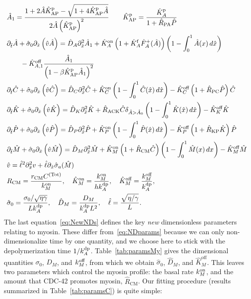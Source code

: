 \documentclass[11pt]{article}
\newcommand{\6}[1]{#1_{\text{6}}}
\newcommand{\3}[1]{#1_{\text{3}}}
\newcommand{\Tot}[1]{#1^\text{(Tot)}}
\newcommand{\My}[1]{#1_M}
\begin{document}
\begin{subequations}
\label{eq:Everything}
\begin{align}
& \hat A_1 = \frac{1+2\hat A \KhatpAP-\sqrt{1+4 \KhatpAP \hat A}}{2 \hat A \left(\KhatpAP\right)^2} \qquad \KhatpAP=\frac{\KhatpA}{1+\hat R_\text{PA} \hat P}\\ 
& \Dthat \hat A  +\hat{\sigma}_0  \Dxhat \left(\hat{v} \hat{A} \right)= \DhatA \Dxhat^2 \hat A_1+\KhatonA \left(1+\KhatfA \hat F_A^+(\hat A) \right)\left(1 - \int_0^1 \hat A(x) \, d\hat{x} \right) \\ \nonumber & \qquad - \Khatoff_{A,1}  \frac{\hat A_1}{\left(1-\beta \KhatpAP \hat A_1\right)^2}\\
&\Dthat \hat{C}+\hat{\sigma}_0  \Dxhat \left(\hat{v} \hat{C} \right)  =\DhatC \Dxhat^2 \hat{C} +\KhatonC \left(1 - \int_0^1 \hat{C}(\hat x) \, d\hat{x} \right)  - \KhatoffC \left(1+\hat{R}_\text{PC}\hat P\right)\hat{C}\\
&\Dthat \hat{K} +\hat{\sigma}_0  \Dxhat \left(\hat{v} \hat{K} \right) = \DhatK \Dxhat^2 \hat{K} + \hat{R}_\text{ACK} \hat{C} \delta_{\hat A > \hat A_0} \left(1 - \int_0^1 \hat{K}(\hat x) \, d\hat{x} \right)-\KhatoffK \hat{K} \\
&\Dthat \hat{P} +\hat{\sigma}_0  \Dxhat \left(\hat{v} \hat{P} \right)  =\DhatP \Dxhat^2 \hat{P} +\KhatonP \left(1 - \int_0^1 \hat{P}(\hat x) \, d\hat{x} \right)  - \KhatoffP \left(1+\hat{R}_\text{KP}\hat{K}\right)\hat{P}\\
&\Dthat \hat{M} +\hat{\sigma}_0  \Dxhat \left(\hat{v} \hat{M} \right) =\hat{D}_M \Dxhat^2 \hat{M} +\KhatonM \left(1+\hat{R}_\text{CM} \hat C\right) \left(1-\int_0^1  \hat{M}(x) \, dx\right)- \KhatoffM \hat{M}\\
&\hat{v} = \hat{\ell}^2 \Dxhat^2 v +\hat{\ell} \Dxhat \hat{\sigma}_a(\hat{M})\\
\label{eq:NewNDs}
&R_\text{CM}=\frac{r_\text{CM}\Tot{C}}{\kon_M},\quad \hat{K}^\text{on}_M= \frac{\My{\kon}}{h \kdp_A}, \quad \hat{K}^\text{off}_M= \frac{\My{\koff}}{\kdp_A},\\ \nonumber
& \hat{\sigma}_0 = \frac{\sigma_0/ \sqrt{\eta \gamma} }{L \kdp_A},   \quad \hat{D}_M =\frac{D_M}{\kdp_A L^2}, \quad \hat{\ell} = \frac{\sqrt{\eta/\gamma}}{L}.
\end{align}
\end{subequations}
The last equation\ \eqref{eq:NewNDs} defines the key \emph{new} dimensionless parameters relating to myosin. These differ from\ \eqref{eq:NDparams} because we can only non-dimensionalize time by one quantity, and we choose here to stick with the depolymerization time $1/k^\text{dp}_A$. Table\ \ref{tab:paramsMy} gives the dimensional quantities ${\sigma}_0$, $D_M$, and $k^\text{off}_M$, from which we obtain $\hat \sigma_0$, $\hat D_M$, and $\hat K^\text{off}_M$. This leaves two parameters which control the myosin profile: the basal rate $k^\text{on}_M$, and the amount that CDC-42 promotes myosin, $\hat R_\text{CM}$. Our fitting procedure (results summarized in Table\ \ref{tab:paramsC}) is quite simple:
\end{document}
